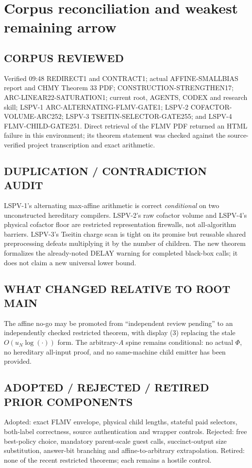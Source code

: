 \documentclass[11pt]{article}
\begin{document}
\section{Corpus reconciliation and weakest remaining arrow}
\subsection*{CORPUS REVIEWED}
Verified 09:48 REDIRECT1 and CONTRACT1; actual AFFINE-SMALLBIAS report and
CHMY Theorem 33 PDF; CONSTRUCTION-STRENGTHEN17; ARC-LINEAR22-SATURATION1;
current root, AGENTS, CODEX and research skill; LSPV-1
ARC-ALTERNATING-FLMV-GATE1; LSPV-2 COFACTOR-VOLUME-ARC252; LSPV-3
TSEITIN-SELECTOR-GATE255; and LSPV-4 FLMV-CHILD-GATE251.  Direct retrieval of
the FLMV PDF returned an HTML failure in this environment; its theorem statement
was checked against the source-verified project transcription and exact arithmetic.

\subsection*{DUPLICATION / CONTRADICTION AUDIT}
LSPV-1's alternating max-affine arithmetic is correct \emph{conditional} on two
unconstructed hereditary compilers.  LSPV-2's raw cofactor volume and LSPV-4's
physical cofactor floor are restricted representation firewalls, not all-algorithm
barriers.  LSPV-3's Tseitin charge scan is tight on its promise but reusable shared
preprocessing defeats multiplying it by the number of children.  The new theorem
formalizes the already-noted DELAY warning for completed black-box calls; it does
not claim a new universal lower bound.

\subsection*{WHAT CHANGED RELATIVE TO ROOT MAIN}
The affine no-go may be promoted from ``independent review pending'' to an
independently checked restricted theorem, with display (3) replacing the stale
$O(u_N\log(\cdot))$ form.  The arbitrary-$A$ spine remains conditional: no actual
$\Phi$, no hereditary all-input proof, and no same-machine child emitter has been
provided.

\subsection*{ADOPTED / REJECTED / RETIRED PRIOR COMPONENTS}
Adopted: exact FLMV envelope, physical child lengths, stateful paid selectors,
both-label correctness, source authentication and wrapper controls.  Rejected:
free best-policy choice, mandatory parent-scale guest calls, succinct-output size
substitution, answer-bit branching and affine-to-arbitrary extrapolation.  Retired:
none of the recent restricted theorems; each remains a hostile control.
\end{document}

